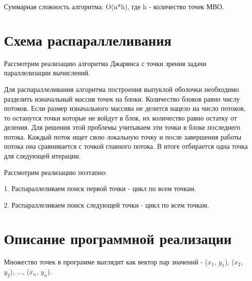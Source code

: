 \documentclass{report}
\begin{document}
\par Суммарная сложность алгоритма: O(n*h), где h - количество точек МВО.

\newpage

\section*{Схема распараллеливания}
Рассмотрим реализацию алгоритма Джарвиса с точки зрения задачи параллелизации вычислений.

\par Для распараллеливания алгоритма построения выпуклой оболочки необходимо разделить изначальный массив точек на блоки. Количество блоков равно числу потоков. Если размер изначального массива не делится нацело на число потоков, то останутся точки которые не войдут в блок, их количество равно остатку от деления. Для решения этой проблемы учитываем эти точки в блоке последнего потока. Каждый поток ищет свою локальную точку и после завершения работы потока она сравнивается с точкой главного потока. В итоге отбирается одна точка для следующей итерации.

\par Рассмотрим реализацию поэтапно:

\par 1. Распараллеливаем поиск первой точки - цикл по всем точкам.
\par 2. Распараллеливаем поиск следующей точки - цикл по всем точкам.

\newpage

\section*{Описание программной реализации}
Множество точек в программе выглядит как вектор пар значений - {($x_{1}$, $y_{1}$), ($x_{2}$, $y_{2}$), ..., ($x_{n}$, $y_{n}$)}.
\end{document}
